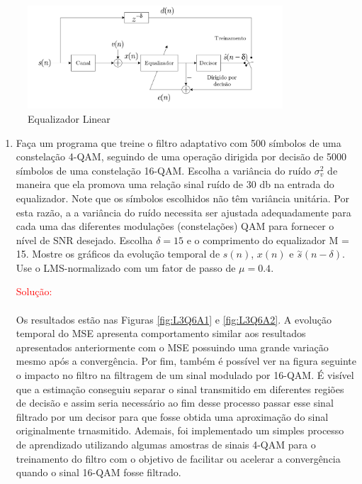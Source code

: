 \documentclass[a4paper,10pt]{article}
\begin{document}
\begin{enumerate}
				\begin{figure}[H]
					\centering
					\includegraphics[width=0.85\textwidth]{figs/equalizador_linear.png}
					\caption{Equalizador Linear}
				\end{figure}
			
				\begin{enumerate}
					
					\item Faça um programa que treine o ﬁltro adaptativo com 500 símbolos de uma constelação 4-QAM, seguindo de uma operação dirigida por decisão de 5000 símbolos de uma constelação 16-QAM. Escolha a variância do ruído $\sigma^{2}_{v}$ de maneira que ela promova uma relação sinal ruído de 30 db na entrada do equalizador. Note que os símbolos escolhidos não têm variância unitária. Por esta razão, a a variância do ruído necessita ser ajustada adequadamente para cada uma das diferentes modulações (constelações) QAM para fornecer o nível de SNR desejado. Escolha $\delta = 15$ e o comprimento do equalizador M = 15. Mostre os gráﬁcos da evolução temporal de $s(n)$, $x(n)$ e $\overset{\sim}{s}(n - \delta)$. Use o LMS-normalizado com um fator de passo de $\mu = 0.4$.
								
						\textcolor{red}{Solução:}

						\paragraph{}Os resultados estão nas Figuras \ref{fig:L3Q6A1} e \ref{fig:L3Q6A2}. A evolução temporal do MSE apresenta comportamento similar aos resultados apresentados anteriormente com
						o MSE possuindo uma grande variação mesmo após a convergência. Por fim, também é possível ver na figura seguinte o impacto no filtro na filtragem de um sinal modulado por 16-QAM. É visível 
						que a estimação conseguiu separar o sinal transmitido em diferentes regiões de decisão e assim seria necessário ao fim desse processo passar esse sinal filtrado por um decisor para que fosse
						obtida uma aproximação do sinal originalmente trnasmitido. Ademais, foi implementado um simples processo de aprendizado utilizando algumas amostras de sinais 4-QAM para o treinamento do filtro com
						o objetivo de facilitar ou acelerar a convergência quando o sinal 16-QAM fosse filtrado.


\end{enumerate}
\end{enumerate}
\end{document}
